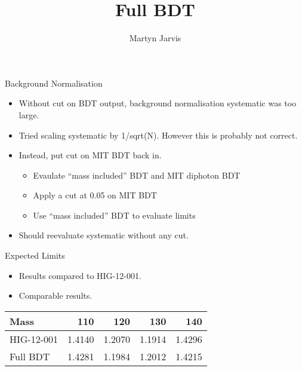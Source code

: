 \documentclass[t, 8pt]{beamer}
\author{Martyn Jarvis}
\title[Full BDT]{Full BDT}
\begin{document}


\begin{frame}{Background Normalisation}
  \begin{itemize}
    \item Without cut on BDT output, background normalisation systematic was too large.
    \item Tried scaling systematic by 1/sqrt(N). However this is probably not correct.
    \item Instead, put cut on MIT BDT back in.
    \begin{itemize}
        \item Evaulate ``mass included'' BDT and MIT diphoton BDT
        \item Apply a cut at 0.05 on MIT BDT
        \item Use ``mass included'' BDT to evaluate limits
    \end{itemize}
    \item Should reevaluate systematic without any cut.
  \end{itemize}
\end{frame}

\begin{frame}{Expected Limits}
  \vspace{1cm}
  \begin{itemize}
    \item Results compared to HIG-12-001.
    \item Comparable results.
  \end{itemize}
\begin{center}

\begin{table}[htbp]
\begin{tabular}{|l|r r r r |}
\hline
Mass                & 110    & 120    & 130    & 140    \\ \hline
HIG-12-001          & 1.4140 & 1.2070 & 1.1914 & 1.4296 \\ 
Full BDT            & 1.4281 & 1.1984 & 1.2012 & 1.4215 \\ \hline
\end{tabular}
\end{table}
\end{center}
\end{frame}
\end{document}
